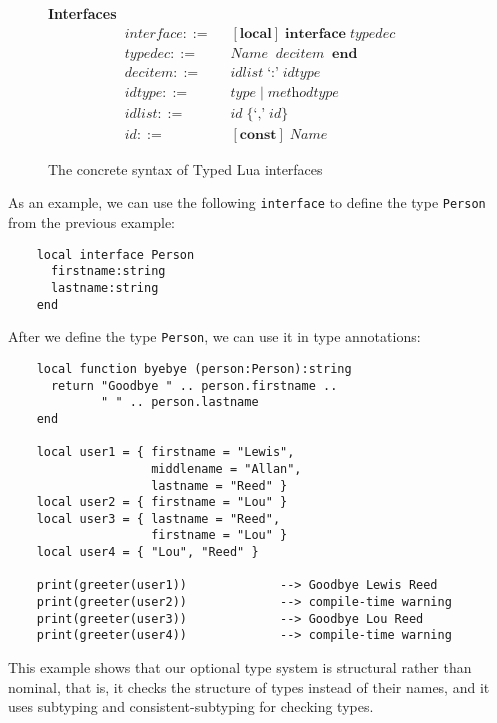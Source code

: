 \begin{figure}[!ht]
\textbf{Interfaces}\\
\dstart
\begin{align*}
\textit{interface} ::= & \;\; [\textbf{local}] \; \textbf{interface} \; \textit{typedec}\\
\textit{typedec} ::= & \;\; \textit{Name} \; { \; \textit{decitem} \; } \; \textbf{end}\\
\textit{decitem} ::= & \;\; \textit{idlist} \; \texttt{`:'} \; \textit{idtype}\\
\textit{idtype} ::= & \;\; \textit{type} \; | \; \textit{methodtype}\\
\textit{idlist} ::= & \;\; \textit{id} \; \{\texttt{`,'} \; \textit{id}\}\\
\textit{id} ::= & \;\; [\textbf{const}] \; \textit{Name}
\end{align*}
\dend
\caption{The concrete syntax of Typed Lua interfaces}
\label{fig:interfaces}
\end{figure}

As an example, we can use the following \texttt{interface} to
define the type \texttt{Person} from the previous example:
\begin{verbatim}
    local interface Person
      firstname:string
      lastname:string
    end
\end{verbatim}

After we define the type \texttt{Person}, we can use it in type annotations:
\begin{verbatim}
    local function byebye (person:Person):string
      return "Goodbye " .. person.firstname ..
             " " .. person.lastname
    end

    local user1 = { firstname = "Lewis",
                    middlename = "Allan",
                    lastname = "Reed" }
    local user2 = { firstname = "Lou" }
    local user3 = { lastname = "Reed",
                    firstname = "Lou" }
    local user4 = { "Lou", "Reed" }

    print(greeter(user1))             --> Goodbye Lewis Reed 
    print(greeter(user2))             --> compile-time warning
    print(greeter(user3))             --> Goodbye Lou Reed
    print(greeter(user4))             --> compile-time warning
\end{verbatim}

This example shows that our optional type system is structural rather
than nominal, that is, it checks the structure of types instead of
their names, and it uses subtyping and consistent-subtyping for
checking types.

